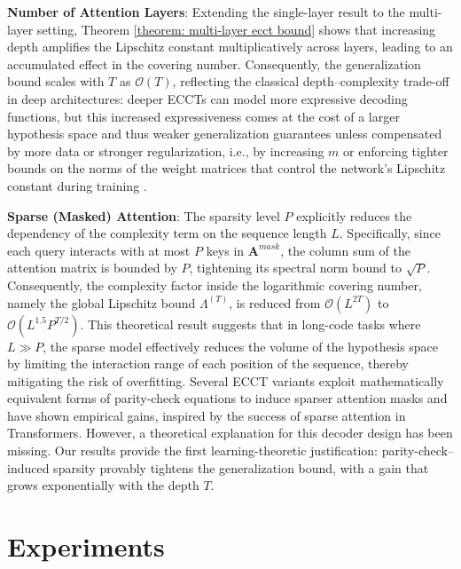 \documentclass[lettersize,onecolumn]{IEEEtran}
\begin{document}
\textbf{Number of Attention Layers}: Extending the single-layer result to the multi-layer setting, Theorem \ref{theorem: multi-layer ecct bound} shows that increasing depth amplifies the Lipschitz constant multiplicatively across layers, leading to an accumulated effect in the covering number. Consequently, the generalization bound scales with $T$ as $\mathcal{O}(T)$, reflecting the classical depth–complexity trade-off in deep architectures: deeper ECCTs can model more expressive decoding functions, but this increased expressiveness comes at the cost of a larger hypothesis space and thus weaker generalization guarantees unless compensated by more data or stronger regularization, i.e., by increasing $m$ or enforcing tighter bounds on the norms of the weight matrices that control the network’s Lipschitz constant during training \cite{krogh1991simpleweightdecay,loshchilov2017decoupledweightdecay,miyato2018spectralnormalization}.

\textbf{Sparse (Masked) Attention}: The sparsity level $P$ explicitly reduces the dependency of the complexity term on the sequence length $L$. Specifically, since each query interacts with at most $P$ keys in $\mathbf{A}^{mask}$, the column sum of the attention matrix is bounded by $P$, tightening its spectral norm bound to $\sqrt{P}$. Consequently, the complexity factor inside the logarithmic covering number, namely the global Lipschitz bound $\Lambda^{(T)}$, is reduced from $\mathcal{O}(L^{2T})$ to $\mathcal{O}(L^{1.5}P^{T/2})$. This theoretical result suggests that in long-code tasks where $L\gg P$, the sparse model effectively reduces the volume of the hypothesis space by limiting the interaction range of each position of the sequence, thereby mitigating the risk of overfitting. Several ECCT variants \cite{park2025crossmpt,park2025multipleMasktforECCT} exploit mathematically equivalent forms of parity-check equations to induce sparser attention masks and have shown empirical gains, inspired by the success of sparse attention in Transformers. However, a theoretical explanation for this decoder design has been missing. Our results provide the first learning-theoretic justification: parity-check–induced sparsity provably tightens the generalization bound, with a gain that grows exponentially with the depth $T$.

\section{Experiments}
\end{document}
